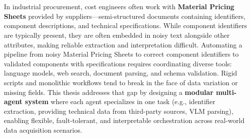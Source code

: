 \chapter{\abstractname}

In industrial procurement, cost engineers often work with \textbf{Material Pricing Sheets} provided by suppliers—semi-structured documents containing identifiers, component descriptions, and technical specifications. While component identifiers are typically present, they are often embedded in noisy text alongside other attributes, making reliable extraction and interpretation difficult. Automating a pipeline from noisy Material Pricing Sheets to correct component identifiers to validated components with specifications requires coordinating diverse tools: language models, web search, document parsing, and schema validation. Rigid scripts and monolithic workflows tend to break in the face of data variation or missing fields. This thesis addresses that gap by designing a \textbf{modular multi-agent system} where each agent specializes in one task (e.g., identifier extraction, providing technical data from third-party sources, VLM parsing), enabling flexible, fault-tolerant, and interpretable orchestration across real-world data acquisition scenarios.
